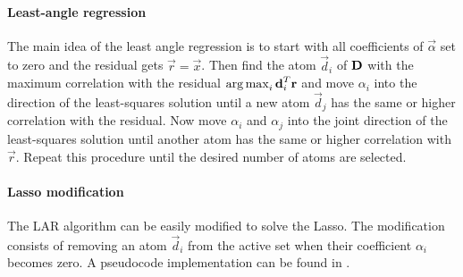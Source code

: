 \paragraph{Least-angle regression}
The main idea of the least angle regression is to start with all coefficients
of $\vec{\alpha}$ set to zero and the residual gets $\vec{r}=\vec{x}$. Then
find the atom $\vec{d}_i$ of $\boldsymbol{\mathrm{D}}$ with the maximum correlation
with the residual $\operatorname*{arg\,max}_i\boldsymbol{\mathrm{d}}_i^T\boldsymbol{\mathrm{r}}$ and move $\alpha_i$ 
into the direction of the least-squares solution until a new atom
$\vec{d}_j$ has the same or higher correlation with the residual. Now move
$\alpha_i$ and $\alpha_j$ into the joint direction of the
least-squares solution until another atom has the same or higher correlation
with $\vec{r}$. Repeat this procedure until the desired number of atoms are
selected.



\paragraph{Lasso modification}
The LAR algorithm can be easily modified to solve the Lasso. 
The modification consists of removing an atom $\vec{d}_i$ from the active set
when their coefficient $\alpha_i$ becomes zero. A pseudocode implementation can
be found in .

